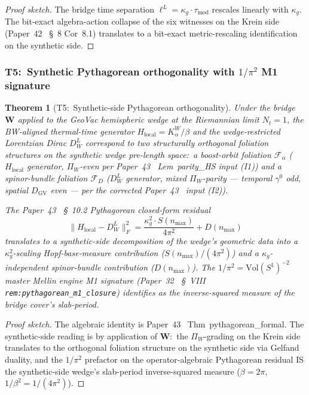 \documentclass[11pt,a4paper]{article}
\theoremstyle{plain}
\newtheorem{theorem}{Theorem}[section]
\theoremstyle{definition}
\newcommand{\nmax}{n_{\max}}
\newcommand{\Nt}{N_{t}}
\newcommand{\Sone}{S^{1}}
\newcommand{\Frob}[1]{\lVert #1 \rVert_{F}}
\newcommand{\DGV}{D_{\mathrm{GV}}}
\newcommand{\Wfun}{\mathbf{W}}
\newcommand{\Kalpha}{K_{\alpha}^{W}}
\newcommand{\Hloc}{H_{\mathrm{local}}}
\newcommand{\Dwedge}{D_{W}^{L}}
\newcommand{\tmod}{\tau_{\mathrm{mod}}}
\newcommand{\kappag}{\kappa_{g}}
\begin{document}
\begin{proof}[Proof sketch]
The bridge time separation $\ell^{L} = \kappag\cdot\tmod$ rescales
linearly with $\kappag$. The bit-exact algebra-action collapse of the
six witnesses on the Krein side (Paper~42~\cite{paper42} \S~8 Cor~8.1)
translates to a bit-exact metric-rescaling identification on the
synthetic side.
\end{proof}

\subsubsection{T5:\ Synthetic Pythagorean orthogonality with $1/\pi^{2}$
M1 signature}\label{sec:t5_synthetic_pythagorean}

\begin{theorem}[T5:\ Synthetic-side Pythagorean
orthogonality]\label{thm:synthetic_pythagorean}
Under the bridge $\Wfun$ applied to the GeoVac hemispheric wedge at
the Riemannian limit $\Nt = 1$, the BW-aligned thermal-time generator
$\Hloc = \Kalpha/\beta$ and the wedge-restricted Lorentzian Dirac
$\Dwedge$ correspond to two structurally orthogonal foliation
structures on the synthetic wedge pre-length space:\ a boost-orbit
foliation $\mathcal{F}_{\alpha}$ ($\Hloc$ generator, $\Pi_{W}$-even
per Paper~43~\cite{paper43} Lem~parity\_HS input (I1)) and a
spinor-bundle foliation $\mathcal{F}_{D}$ ($\Dwedge$ generator,
mixed $\Pi_{W}$-parity --- temporal $\gamma^{0}$ odd, spatial $\DGV$ even ---
per the corrected Paper~43~\cite{paper43} input (I2)).

The Paper~43~\cite{paper43} \S~10.2 Pythagorean closed-form residual
\[
\Frob{\Hloc - \Dwedge}^{2} =
\frac{\kappag^{2}\cdot S(\nmax)}{4\pi^{2}} + D(\nmax)
\]
translates to a synthetic-side decomposition of the wedge's geometric
data into a $\kappag^{2}$-scaling Hopf-base-measure contribution
($S(\nmax)/(4\pi^{2})$) and a $\kappag$-independent spinor-bundle
contribution ($D(\nmax)$). The $1/\pi^{2} = \mathrm{Vol}(\Sone)^{-2}$
master Mellin engine M1 signature
(Paper~32~\cite{paper32} \S~VIII \texttt{rem:pythagorean\_m1\_closure})
identifies as the inverse-squared measure of the bridge cover's
slab-period.
\end{theorem}

\begin{proof}[Proof sketch]
The algebraic identity is Paper~43~\cite{paper43} Thm~pythagorean\_formal.
The synthetic-side reading is by application of $\Wfun$:\ the
$\Pi_{W}$-grading on the Krein side translates to the orthogonal
foliation structure on the synthetic side via Gelfand duality, and the
$1/\pi^{2}$ prefactor on the operator-algebraic Pythagorean residual
IS the synthetic-side wedge's slab-period inverse-squared measure
($\beta = 2\pi$, $1/\beta^{2} = 1/(4\pi^{2})$).
\end{proof}
\end{document}

